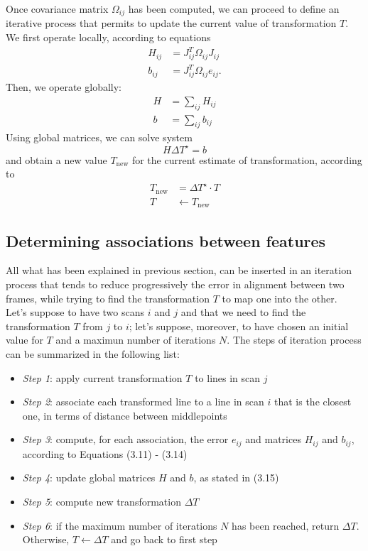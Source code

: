 \documentclass[a4paper, onecolumn]{report}
\begin{document}
Once covariance matrix $\Omega_{ij}$ has been computed, we can proceed to define an iterative process that permits to update the current value of transformation $T$. We first operate locally, according to equations
\begin{equation}
	\begin{aligned}
		H_{ij} &= J_{ij}^T\Omega_{ij}J_{ij} \\
		b_{ij} &= J_{ij}^T\Omega_{ij}e_{ij}.
	\end{aligned}
\end{equation}
Then, we operate globally:
\begin{equation}
	\begin{aligned}
		H &= \sum_{ij} H_{ij} \\
		b &= \sum_{ij} b_{ij}
	\end{aligned}
\end{equation}
Using global matrices, we can solve system 
\begin{equation}
	H\Delta T^\star = b
\end{equation}
and obtain a new value $T_{\mbox{new}}$ for the current estimate of transformation, according to
\begin{equation}
	\begin{aligned}
		T_{\mbox{new}} &= \Delta T^\star \cdot T \\
		T  &\leftarrow  T_{\mbox{new}} 
	\end{aligned}
\end{equation}

\subsection{Determining associations between features}
All what has been explained in previous section, can be inserted in an iteration process that tends to reduce progressively the error in alignment between two frames, while trying to find the transformation $T$ to map one into the other. \\
Let's suppose to have two scans $i$ and $j$ and that we need to find the transformation $T$ from $j$ to $i$; let's suppose, moreover, to have chosen an initial value for $T$ and a maximun number of iterations $N$. The steps of iteration process can be summarized in the following list:
\begin{itemize}
	\item{\emph{Step 1}}: apply current transformation $T$ to lines in scan $j$
	\item{\emph{Step 2}}: associate each transformed line to a line in scan $i$ that is the closest one, in terms of distance between middlepoints
	\item{\emph{Step 3}}: compute, for each association, the error $e_{ij}$ and matrices $H_{ij}$ and $b_{ij}$, according to Equations (3.11) - (3.14)
	\item{\emph{Step 4}}: update global matrices $H$ and $b$, as stated in (3.15)
	\item{\emph{Step 5}}: compute new transformation $\Delta T$
	\item{\emph{Step 6}}: if the maximum number of iterations $N$ has been reached, return $\Delta T$. Otherwise, $T \leftarrow \Delta T$ and go back to first step
\end{itemize}
\end{document}
